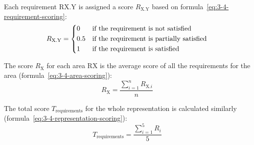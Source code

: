 Each requirement RX.Y is assigned a score $R_{\text{X.Y}}$ based on formula~\ref{eq:3-4-requirement-scoring}:
\begin{equation}
    R_{\text{X.Y}} =
    \begin{dcases}
        0   & \text{if the requirement is not satisfied}\\
        0.5 & \text{if the requirement is partially satisfied}\\
        1   & \text{if the requirement is satisfied}
    \end{dcases}
    \label{eq:3-4-requirement-scoring}
\end{equation}

The score $R_{\text{X}}$ for each area RX is the average score of all the requirements for the area (formula~\ref{eq:3-4-area-scoring}):
\begin{equation}
    R_{\text{X}} = \frac{\sum_{i=1}^{n} R_{\text{X.$i$}}}{n}
    \label{eq:3-4-area-scoring}
\end{equation}

The total score $T_{\text{requirements}}$ for the whole representation is calculated similarly (formula~\ref{eq:3-4-representation-scoring}):
\begin{equation}
    T_{\text{requirements}} = \frac{\sum_{i=1}^{5} R_i}{5}
    \label{eq:3-4-representation-scoring}
\end{equation}

